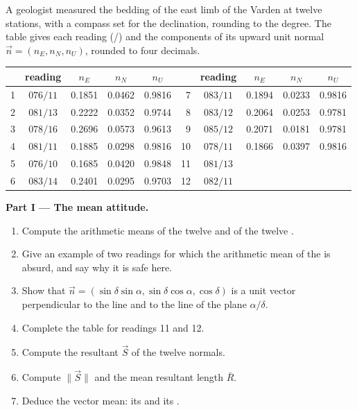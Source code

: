\begin{problem}
\label{pb:b1:field-lab-methods-1:1}
A geologist measured the bedding of the east limb of the Varden  at
twelve stations, with a compass set for the declination, rounding to the
degree. The table gives each reading (/) and the components of
its upward unit normal $\vec n = (n_E, n_N, n_U)$, rounded to four decimals.
\begin{center}
\small
\begin{tabular}{rcccc@{\qquad}rcccc}
\hline
 & reading & $n_E$ & $n_N$ & $n_U$ & & reading & $n_E$ & $n_N$ & $n_U$ \\
\hline
1 & $076/11$ & 0.1851 & 0.0462 & 0.9816 & 7 & $083/11$ & 0.1894 & 0.0233 & 0.9816 \\
2 & $081/13$ & 0.2222 & 0.0352 & 0.9744 & 8 & $083/12$ & 0.2064 & 0.0253 & 0.9781 \\
3 & $078/16$ & 0.2696 & 0.0573 & 0.9613 & 9 & $085/12$ & 0.2071 & 0.0181 & 0.9781 \\
4 & $081/11$ & 0.1885 & 0.0298 & 0.9816 & 10 & $078/11$ & 0.1866 & 0.0397 & 0.9816 \\
5 & $076/10$ & 0.1685 & 0.0420 & 0.9848 & 11 & $081/13$ & & & \\
6 & $083/14$ & 0.2401 & 0.0295 & 0.9703 & 12 & $082/11$ & & & \\
\hline
\end{tabular}
\end{center}

\medskip
\noindent\textbf{Part I --- The mean attitude.}
\begin{enumerate}
  \item Compute the arithmetic means of the twelve  and of the
        twelve .
  \item Give an example of two readings for which the arithmetic mean of the
         is absurd, and say why it is safe here.
  \item Show that $\vec n = (\sin\delta\sin\alpha, \sin\delta\cos\alpha,
        \cos\delta)$ is a unit vector perpendicular to the  line and to
        the  line of the plane $\alpha/\delta$.
  \item Complete the table for readings 11 and 12.
  \item Compute the resultant $\vec S$ of the twelve normals.
  \item Compute $\|\vec S\|$ and the mean resultant length $\bar R$.
  \item Deduce the vector mean: its  and its .
\end{enumerate}


\end{problem}
